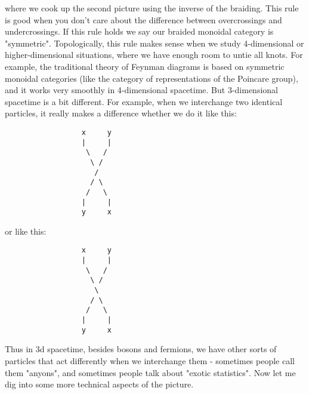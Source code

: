where we cook up the second picture using the inverse of the braiding.
This rule is good when you don't care about the difference between
overcrossings and undercrossings.  If this rule holds we say our 
braided monoidal category is "symmetric".  Topologically, this rule 
makes sense when we study 4-dimensional or higher-dimensional situations,
where we have enough room to untie all knots.  For example, the
traditional theory of Feynman diagrams is based on symmetric monoidal
categories (like the category of representations of the Poincare
group), and it works very smoothly in 4-dimensional spacetime.
But 3-dimensional spacetime is a bit different.  For example,
when we interchange two identical particles, it really makes
a difference whether we do it like this:
\begin{verbatim}
                  x     y               
                  |     |         
                   \   /         
                    \ /         
                     /         
                    / \       
                   /   \     
                  |     |   
                  y     x               
\end{verbatim}
    
or like this:
\begin{verbatim}
                  x     y               
                  |     |         
                   \   /         
                    \ /         
                     \         
                    / \       
                   /   \     
                  |     |   
                  y     x               
\end{verbatim}
    
Thus in 3d spacetime, besides bosons and fermions, we have other sorts
of particles that act differently when we interchange them - sometimes
people call them "anyons", and sometimes people talk about "exotic
statistics".  
Now let me dig into some more technical aspects of the picture.  

